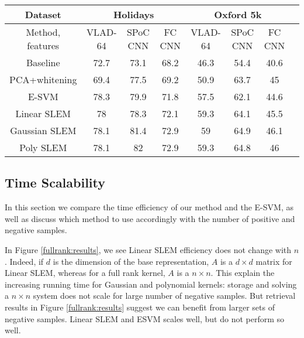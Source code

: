 \begin{table*}[t]
\begin{center}
\caption{Mean average precision results for INRIA Holidays and Oxford buildings datasets, expressed as percentages. In this table, we present our results for VLAD-64 \ref{VLAD}, sum-pooling of convolutional features (SPoC) \ref{babenko15} and fully connected (fc) CNN \ref{jia2014caffe}}
\begin{tabular}{|c|c|c|c|c|c|c|c|}
\hline
Dataset & \multicolumn{3}{|c|}{\textbf{Holidays}} & \multicolumn{3}{|c|}{\textbf{Oxford 5k}}\\
\hline
Method, features & VLAD-64  & SPoC CNN & FC CNN & VLAD-64 & SPoC CNN & FC CNN\\
\hline\hline
Baseline            & 72.7 & 73.1 & 68.2  & 46.3 & 54.4 & 40.6\\
PCA+whitening       & 69.4 & 77.5 & 69.2 & 50.9  & 63.7 & 45 \\
E-SVM               & 78.3 & 79.9 & 71.8 & 57.5  & 62.1 & 44.6\\
Linear SLEM         & 78   & 78.3 & 72.1 & 59.3  & 64.1 & 45.5\\
Gaussian SLEM       & 78.1 & 81.4 & 72.9 & 59    & 64.9 & 46.1\\
Poly SLEM           & 78.1 &  82  & 72.9 & 59.3  & 64.8 & 46\\
\hline
\end{tabular}
\end{center}
\label{fullrank:results}
\end{table*}


\subsection{Time Scalability} \label{time-scale}
In this section we compare the time efficiency of our method and the E-SVM, as well as discuss which method to use accordingly with the number of positive and negative samples.

In Figure \ref{fullrank:results}, we see Linear SLEM efficiency does not change with $n$.
Indeed, if $d$ is the dimension of the base representation, $A$ is a $d\times d$ matrix for Linear SLEM, whereas for a full rank kernel, $A$ is a $n\times n$.
This explain the increasing running time for Gaussian and polynomial kernels: storage and solving a $n\times n$ system does not scale for large number of negative samples.
But retrieval results in Figure \ref{fullrank:results} suggest we can benefit from larger sets of negative samples. Linear SLEM and ESVM scales well, but do not perform so well.

